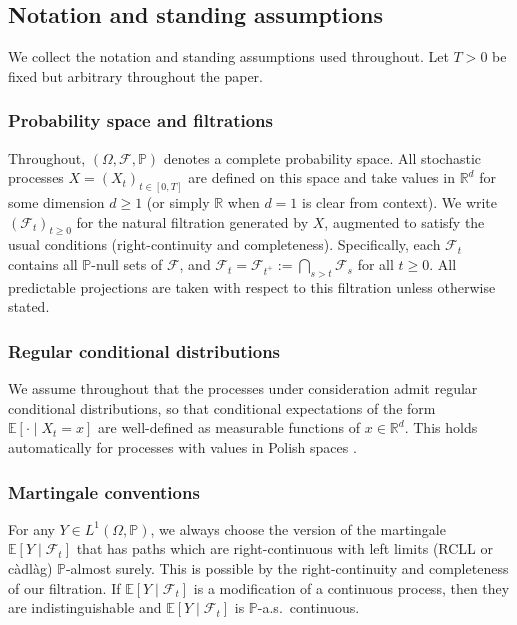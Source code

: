 \documentclass[12pt]{article}
\theoremstyle{plain}
\theoremstyle{definition}
\theoremstyle{remark}
\newcommand{\E}{\mathbb{E}}
\newcommand{\R}{\mathbb{R}}
\newcommand{\F}{\mathcal{F}}
\newcommand{\PP}{\mathbb{P}}
\begin{document}
\subsection{Notation and standing assumptions}\label{sec:notation}

We collect the notation and standing assumptions used throughout. Let $T > 0$ be fixed but arbitrary throughout the paper.

\subsubsection*{Probability space and filtrations}
Throughout, $(\Omega, \F, \PP)$ denotes a complete probability space. All stochastic processes $X = (X_t)_{t \in [0,T]}$ are defined on this space and take values in $\R^d$ for some dimension $d \geq 1$ (or simply $\R$ when $d=1$ is clear from context). We write $(\F_t)_{t \geq 0}$ for the natural filtration generated by $X$, augmented to satisfy the usual conditions (right-continuity and completeness). Specifically, each $\F_t$ contains all $\PP$-null sets of $\F$, and $\F_t = \F_{t^+} := \bigcap_{s > t} \F_s$ for all $t \geq 0$. All predictable projections are taken with respect to this filtration unless otherwise stated.

\subsubsection*{Regular conditional distributions}
We assume throughout that the processes under consideration admit regular conditional distributions, so that conditional expectations of the form $\E[\cdot \mid X_t = x]$ are well-defined as measurable functions of $x \in \R^d$. This holds automatically for processes with values in Polish spaces \cite{RevuzYor1999}.

\subsubsection*{Martingale conventions}
For any $Y \in L^1(\Omega, \PP)$, we always choose the version of the martingale $\E[Y \mid \F_t]$ that has paths which are right-continuous with left limits (RCLL or c\`adl\`ag) $\PP$-almost surely. This is possible by the right-continuity and completeness of our filtration. If $\E[Y \mid \F_t]$ is a modification of a continuous process, then they are indistinguishable and $\E[Y \mid \F_t]$ is $\PP$-a.s.\ continuous.
\end{document}
